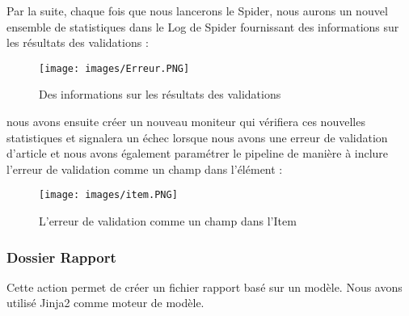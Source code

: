 Par la suite, chaque fois que nous lancerons le Spider, nous aurons un nouvel ensemble de statistiques dans le Log de Spider fournissant des informations sur les résultats des validations :
\begin{figure}[H]
            \centering
            \texttt{[image: images/Erreur.PNG]}
            \caption{Des informations sur les résultats des validations}
            \label{fig:activate}  
        \end{figure}
nous avons ensuite créer un nouveau moniteur qui vérifiera ces nouvelles statistiques et signalera un échec lorsque nous avons une erreur de validation d'article et nous avons également paramétrer le pipeline de manière à inclure l'erreur de validation comme un champ dans l'élément :
\begin{figure}[H]
            \centering
            \texttt{[image: images/item.PNG]}
            \caption{L'erreur de validation comme un champ dans l'Item}
            \label{fig:activate}  
        \end{figure}
\subsubsection{Dossier Rapport}
Cette action permet de créer un fichier rapport basé sur un modèle. Nous avons utilisé Jinja2 comme moteur de modèle.\\

